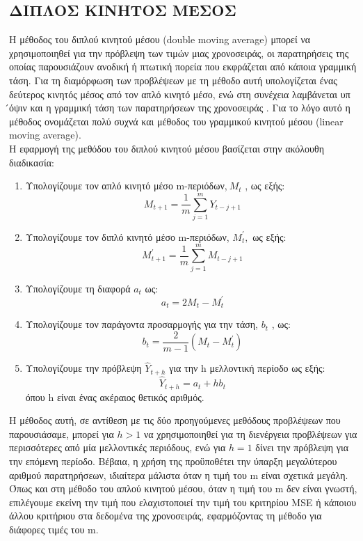 \subsection{ΔΙΠΛΟΣ ΚΙΝΗΤΟΣ ΜΕΣΟΣ}

Η μέθοδος του διπλού κινητού μέσου (double moving average) μπορεί να
χρησιμοποιηθεί για την πρόβλεψη των τιμών μιας χρονοσειράς, οι παρατηρήσεις της
οποίας παρουσιάζουν ανοδική ή πτωτική πορεία που εκφράζεται από κάποια
γραμμική τάση. Για τη διαμόρφωση των προβλέψεων με τη μέθοδο αυτή
υπολογίζεται ένας δεύτερος κινητός μέσος από τον απλό κινητό μέσο, ενώ στη
συνέχεια λαμβάνεται υπ ́όψιν και η γραμμική τάση των παρατηρήσεων της
χρονοσειράς . Για το λόγο αυτό η μέθοδος ονομάζεται πολύ συχνά και μέθοδος του
γραμμικού κινητού μέσου (linear moving average).\\

Η εφαρμογή της μεθόδου του διπλού κινητού μέσου βασίζεται στην ακόλουθη
διαδικασία:\\
\begin{enumerate}
\item Υπολογίζουμε τον απλό κινητό μέσο m-περιόδων,$\: M_t$ , ως εξής:\\
$$ M_{t+1}=\frac{1}{m} \sum_{j=1}^m Y_{t-j+1} $$
\item Υπολογίζουμε τον διπλό κινητό μέσο m-περιόδων, $M^{'}_t, $ ως εξής:\\
$$ M^{'}_{t+1}= \frac{1}{m} \sum_{j=1}^m M_{t-j+1} $$
\item Υπολογίζουμε τη διαφορά $a_t$ ως:\\
$$a_t=2M_t-M^{'}_t $$
\item Υπολογίζουμε τον παράγοντα προσαρμογής για την τάση, $b_t$ , ως:\\
$$ b_t=\frac{2}{m-1} \left(M_t -M^{'}_t \right)$$ 
\item Υπολογίζουμε την πρόβλεψη $\widehat{Y}_{t + h}$ για την h μελλοντική περίοδο ως εξής:\\
$$ \widehat{Y}_{t+h}=a_t+hb_t $$
όπου h είναι ένας ακέραιος θετικός αριθμός.\\
\end{enumerate}

Η μέθοδος αυτή, σε αντίθεση με τις δύο προηγούμενες μεθόδους προβλέψεων που
παρουσιάσαμε, μπορεί για $h>1$ να χρησιμοποιηθεί για τη διενέργεια προβλέψεων για
περισσότερες από μία μελλοντικές περιόδους, ενώ για $h=1$ δίνει την πρόβλεψη για
την επόμενη περίοδο. Βέβαια, η χρήση της προϋποθέτει την ύπαρξη μεγαλύτερου
αριθμού παρατηρήσεων, ιδιαίτερα μάλιστα όταν η τιμή του m είναι σχετικά μεγάλη.
Όπως και στη μέθοδο του απλού κινητού μέσου, όταν η τιμή του m δεν είναι γνωστή,
επιλέγουμε εκείνη την τιμή που ελαχιστοποιεί την τιμή του κριτηρίου MSE ή κάποιου
άλλου κριτήριου στα δεδομένα της χρονοσειράς, εφαρμόζοντας τη μέθοδο για
διάφορες τιμές του m.


